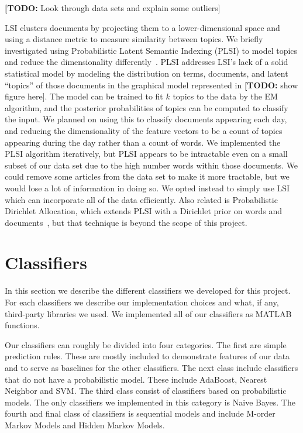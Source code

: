 \documentclass[10pt, twocolumn]{article}
\def\TODO#1{\noindent\textbf{[TODO:} #1]}
\begin{document}
\TODO{Look through data sets and explain some outliers}

LSI clusters documents by projecting them to a lower-dimensional space and using a distance metric to measure similarity between topics. We briefly investigated using Probabilistic Latent Semantic Indexing (PLSI) to model topics and reduce the dimensionality differently~\cite{plsi}. PLSI addresses LSI's lack of a solid statistical model by modeling the distribution on terms, documents, and latent ``topics'' of those documents in the graphical model represented in \TODO{show figure here}. The model can be trained to fit $k$ topics to the data by the EM algorithm, and the posterior probabilities of topics can be computed to classify the input. We planned on using this to classify documents appearing each day, and reducing the dimensionality of the feature vectors to be a count of topics appearing during the day rather than a count of words. We implemented the PLSI algorithm iteratively, but PLSI appears to be intractable even on a small subset of our data set due to the high number words within those documents. We could remove some articles from the data set to make it more tractable, but we would lose a lot of information in doing so. We opted instead to simply use LSI which can incorporate all of the data efficiently. Also related is Probabilistic Dirichlet Allocation, which extends PLSI with a Dirichlet prior on words and documents~\cite{lda}, but that technique is beyond the scope of this project.

\section{Classifiers}
\label{sec:techniques}

In this section we describe the different classifiers we developed for this project.
For each classifiers we describe our implementation choices and what, if any, third-party libraries we used.
We implemented all of our classifiers as MATLAB functions.

Our classifiers can roughly be divided into four categories. The first are simple prediction rules. These are mostly included to demonstrate features of our data and to serve as baselines for the other classifiers. The next class include classifiers that do not have a probabilistic model. These include AdaBoost, Nearest Neighbor and SVM. The third class consist of classifiers based on probabilistic models. The only classifiers we implemented in this category is Naive Bayes. The fourth and final class of classifiers is sequential models and include M-order Markov Models and Hidden Markov Models.
\end{document}
